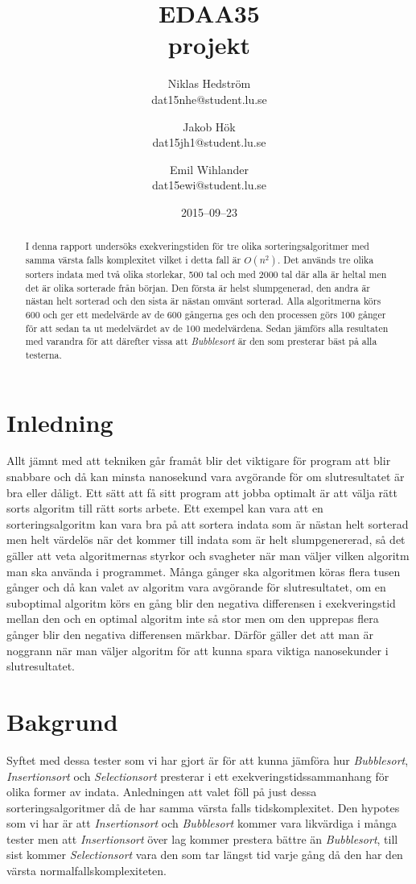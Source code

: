 \documentclass[a4paper]{article}
\title{EDAA35\\ projekt}
\author{Niklas Hedström \\dat15nhe@student.lu.se\and
	    Jakob Hök \\ dat15jh1@student.lu.se \and
	    Emil Wihlander\\ dat15ewi@student.lu.se}
\date{2015--09--23}
\begin{document}
\maketitle

\begin{abstract}
	I denna rapport undersöks exekveringstiden för tre olika sorteringsalgoritmer med samma värsta falls komplexitet vilket i detta fall är $O(n^2)$. Det används tre olika sorters indata med två olika storlekar, 500 tal och med 2000 tal där alla är heltal men det är olika sorterade från början. Den första är helst slumpgenerad, den andra är nästan helt sorterad och den sista är nästan omvänt sorterad. Alla algoritmerna körs 600 och ger ett medelvärde av de 600 gångerna ges och den processen görs 100 gånger för att sedan ta ut medelvärdet av de 100 medelvärdena. Sedan jämförs alla resultaten med varandra för att därefter vissa att \emph{Bubblesort} är den som presterar bäst på alla testerna.
\end{abstract}

\pagebreak

\section{Inledning}
Allt jämnt med att tekniken går framåt blir det viktigare för program att blir snabbare och då kan minsta nanosekund vara avgörande för om slutresultatet är bra eller dåligt. Ett sätt att få sitt program att jobba optimalt är att välja rätt sorts algoritm till rätt sorts arbete. Ett exempel kan vara att en sorteringsalgoritm kan vara bra på att sortera indata som är nästan helt sorterad men helt värdelös när det kommer till indata som är helt slumpgenererad, så det gäller att veta algoritmernas styrkor och svagheter när man väljer vilken algoritm man ska använda i programmet. Många gånger ska algoritmen köras flera tusen gånger och då kan valet av algoritm vara avgörande för slutresultatet, om en suboptimal algoritm körs en gång blir den negativa differensen i exekveringstid mellan den och en optimal algoritm inte så stor men om den upprepas flera gånger blir den negativa differensen märkbar. Därför gäller det att man är noggrann när man väljer algoritm för att kunna spara viktiga nanosekunder i slutresultatet. 

\section{Bakgrund}
Syftet med dessa tester som vi har gjort är för att kunna jämföra hur \emph{Bubblesort}, \emph{Insertionsort} och \emph{Selectionsort} presterar i ett exekveringstidssammanhang för olika former av indata. Anledningen att valet föll på just dessa sorteringsalgoritmer då de har samma värsta falls tidskomplexitet. Den hypotes som vi har är att \emph{Insertionsort} och \emph{Bubblesort} kommer vara likvärdiga i många tester men att \emph{Insertionsort} över lag kommer prestera bättre än \emph{Bubblesort}, till sist kommer \emph{Selectionsort} vara den som tar längst tid varje gång då den har den värsta normalfallskomplexiteten.\cite{sortingAlgoritm}
\end{document}
